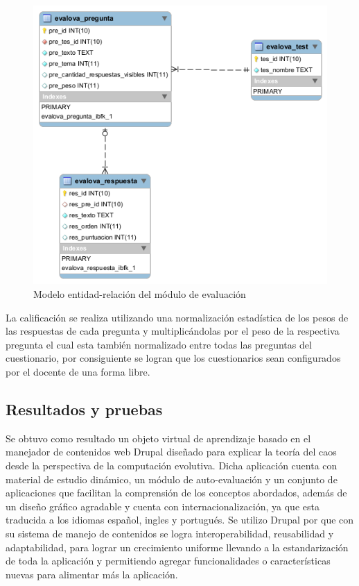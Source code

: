 \documentclass[letterpaper, 11pt, oneside]{article}
\theoremstyle{definition}
\theoremstyle{remark}
\begin{document}
\begin{figure}[htb] 
\begin{center}
\includegraphics[width=12cm,clip]{Imagenes/SQL_Test.png}
\end{center}
\caption{Modelo entidad-relación del módulo de evaluación}
\label{sql_test}
\end{figure}

La calificación se realiza utilizando una normalización estadística de los pesos de las respuestas de cada pregunta y multiplicándolas por el peso de la respectiva pregunta el cual esta también normalizado entre todas las preguntas del cuestionario, por consiguiente se logran que los cuestionarios sean configurados por el docente de una forma libre.

\clearpage
\begin{center}
 \section{Resultados y pruebas}
\end{center}

Se obtuvo como resultado un objeto virtual de aprendizaje basado en el manejador de contenidos web Drupal diseñado para explicar la teoría del caos desde la perspectiva de la computación evolutiva. Dicha aplicación cuenta con material de estudio dinámico, un módulo de auto-evaluación y un conjunto de aplicaciones que facilitan la comprensión de los conceptos abordados, además de un diseño gráfico agradable y cuenta con internacionalización, ya que esta traducida a los idiomas español, ingles y portugués. Se utilizo Drupal por que con su sistema de manejo de contenidos se logra interoperabilidad, reusabilidad y adaptabilidad, para lograr un crecimiento uniforme llevando a la estandarización de toda la aplicación y permitiendo agregar funcionalidades o características nuevas para alimentar más la aplicación.
\end{document}
